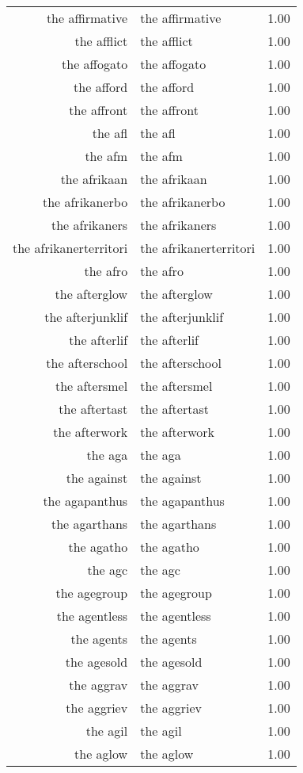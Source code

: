 \begin{table}[ht]
\begin{tabular}{rlr}
  the affirmative & the affirmative & 1.00 \\ 
  the afflict & the afflict & 1.00 \\ 
  the affogato & the affogato & 1.00 \\ 
  the afford & the afford & 1.00 \\ 
  the affront & the affront & 1.00 \\ 
  the afl & the afl & 1.00 \\ 
  the afm & the afm & 1.00 \\ 
  the afrikaan & the afrikaan & 1.00 \\ 
  the afrikanerbo & the afrikanerbo & 1.00 \\ 
  the afrikaners & the afrikaners & 1.00 \\ 
  the afrikanerterritori & the afrikanerterritori & 1.00 \\ 
  the afro & the afro & 1.00 \\ 
  the afterglow & the afterglow & 1.00 \\ 
  the afterjunklif & the afterjunklif & 1.00 \\ 
  the afterlif & the afterlif & 1.00 \\ 
  the afterschool & the afterschool & 1.00 \\ 
  the aftersmel & the aftersmel & 1.00 \\ 
  the aftertast & the aftertast & 1.00 \\ 
  the afterwork & the afterwork & 1.00 \\ 
  the aga & the aga & 1.00 \\ 
  the against & the against & 1.00 \\ 
  the agapanthus & the agapanthus & 1.00 \\ 
  the agarthans & the agarthans & 1.00 \\ 
  the agatho & the agatho & 1.00 \\ 
  the agc & the agc & 1.00 \\ 
  the agegroup & the agegroup & 1.00 \\ 
  the agentless & the agentless & 1.00 \\ 
  the agents & the agents & 1.00 \\ 
  the agesold & the agesold & 1.00 \\ 
  the aggrav & the aggrav & 1.00 \\ 
  the aggriev & the aggriev & 1.00 \\ 
  the agil & the agil & 1.00 \\ 
  the aglow & the aglow & 1.00 \\ 

\end{tabular}
\end{table}
